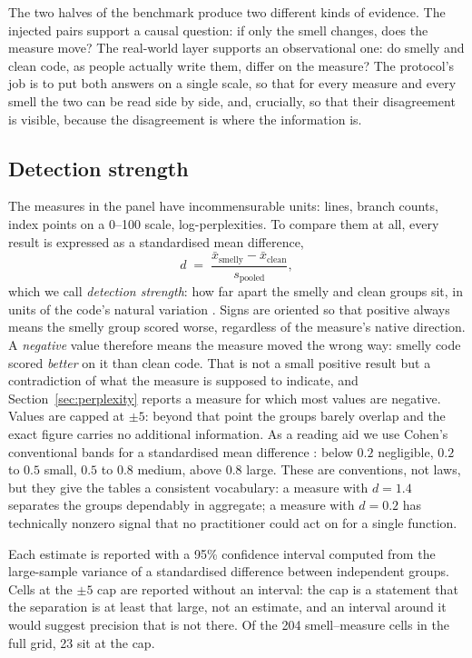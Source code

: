 \documentclass[10pt,a4paper,twocolumn]{article}
\begin{document}
The two halves of the benchmark produce two different kinds of evidence. The
injected pairs support a causal question: if only the smell changes, does the
measure move? The real-world layer supports an observational one: do smelly and
clean code, as people actually write them, differ on the measure? The protocol's
job is to put both answers on a single scale, so that for every measure and
every smell the two can be read side by side, and, crucially, so that their disagreement is visible, because the disagreement is where the
information is.

\subsection{Detection strength}
\label{sec:detection-strength}

The measures in the panel have incommensurable units: lines, branch counts, index
points on a 0--100 scale, log-perplexities. To compare them at all, every result
is expressed as a standardised mean difference,
\begin{equation}
  d \;=\; \frac{\bar{x}_{\text{smelly}} - \bar{x}_{\text{clean}}}
               {s_{\text{pooled}}},
  \label{eq:d}
\end{equation}
which we call \emph{detection strength}: how far apart the smelly and clean
groups sit, in units of the code's natural variation
\cite{cohen1988statistical}. Signs are oriented so that positive always means
the smelly group scored worse, regardless of the measure's native direction. A
\emph{negative} value therefore means the measure moved the wrong way: smelly
code scored \emph{better} on it than clean code. That is not a small positive
result but a contradiction of what the measure is supposed to indicate, and
Section~\ref{sec:perplexity} reports a measure for which most values are
negative. Values are capped at $\pm 5$: beyond that point the groups barely overlap
and the exact figure carries no additional information. As a reading aid we use
Cohen's conventional bands for a standardised mean difference
\cite{cohen1988statistical}: below $0.2$ negligible, $0.2$ to $0.5$ small, $0.5$ to $0.8$
medium, above $0.8$ large. These are conventions, not laws, but they give the
tables a consistent vocabulary: a measure with $d = 1.4$ separates the groups
dependably in aggregate; a measure with $d = 0.2$ has technically nonzero signal that
no practitioner could act on for a single function.

Each estimate is reported with a 95\% confidence interval computed from the
large-sample variance of a standardised difference between independent groups.
Cells at the $\pm 5$ cap are reported without an interval: the cap is a
statement that the separation is at least that large, not an estimate, and an
interval around it would suggest precision that is not there. Of the 204
smell--measure cells in the full grid, 23 sit at the cap.
\end{document}
